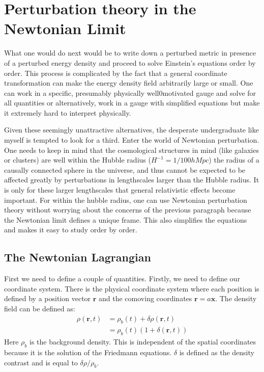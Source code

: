 \documentclass[12pt,a4paper,oneside]{book}
\begin{document}
	\section{Perturbation theory in the Newtonian Limit}
		What one would do next would be to write down a  perturbed metric in presence of a perturbed energy density and proceed to solve Einstein's equations order by order. This process is complicated by the fact that a general coordinate transformation can make the energy density field arbitrarily large or small. One can work in a specific, presumably physically well0motivated gauge and solve for all quantities or alternatively, work in a gauge with simplified equations but make it extremely hard to interpret physically.
		
		Given these seemingly unattractive alternatives, the desperate undergraduate like myself is tempted to look for a third. Enter the world of Newtonian perturbation. One needs to keep in mind that the cosmological structures in mind (like galaxies or clusters) are well within the Hubble radius ($H^{-1} = 1/100h Mpc$) the radius of a causally connected sphere in the universe, and thus cannot be expected to be affected greatly by perturbations in lengthscales larger than the Hubble radius. It is only for these larger lengthscales that general relativistic effects become important. For within the hubble radius, one can use Newtonian perturbation theory without worrying about the concerns of the previous paragraph because the Newtonian limit defines a unique frame. This also simplifies the equations and makes it easy to study order by order.
		
		\subsection{The Newtonian Lagrangian}
			First we need to define a couple of quantities. Firstly, we need to define our coordinate system. There is the physical coordinate system where each position is defined by a position vector $\mathbf{r}$ and the comoving coordinates $\mathbf{r}=a\mathbf{x}$. The density field can be defined as:
			\begin{equation}
				\begin{aligned}
					\rho(\mathbf{r},t)&=\rho_b(t)+\delta\rho(\mathbf{r},t)\\
												 &=\rho_b(t)(1+\delta(\mathbf{r},t))
				\end{aligned}
			\end{equation}
			Here $\rho_b$ is the background density. This is independent of the spatial coordinates because it is the solution of the Friedmann equations. $\delta$ is defined as the density contrast and is equal to $\delta\rho/\rho_b$.
			
\end{document}
